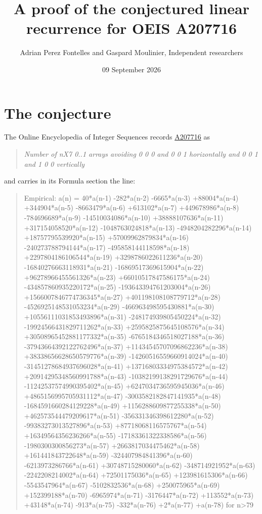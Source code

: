 \documentclass[11pt]{article}
\title{A proof of the conjectured linear recurrence for OEIS A207716}
\author{Adrian Perez Fontelles and Gaspard Moulinier, Independent researchers}
\date{09 September 2026}
\theoremstyle{definition}
\begin{document}
\maketitle
\section{The conjecture}

The Online Encyclopedia of Integer Sequences records \href{https://oeis.org/A207716}{A207716} as

\begin{quote}\itshape Number of nX7 0..1 arrays avoiding 0 0 0 and 0 0 1 horizontally and 0 0 1 and 1 0 0 vertically\end{quote}

and carries in its Formula section the line:

\begin{quote}\ttfamily Empirical: a(n) = 40*a(n-1) -282*a(n-2) -6665*a(n-3) +88004*a(n-4) +344904*a(n-5) -8663479*a(n-6) +613102*a(n-7) +449678986*a(n-8) -784696689*a(n-9) -14510034086*a(n-10) +38888107636*a(n-11) +317154058520*a(n-12) -1048763024818*a(n-13) -4948204282296*a(n-14) +18757795539920*a(n-15) +57009962879834*a(n-16) -240273788794144*a(n-17) -495858144118598*a(n-18) +2297804186106544*a(n-19) +3298786022611236*a(n-20) -16840276663118931*a(n-21) -16869517369615904*a(n-22) +96278966455561326*a(n-23) +66010517847586175*a(n-24) -434857860935220172*a(n-25) -193643394761203004*a(n-26) +1566007846774736345*a(n-27) +401198108108779712*a(n-28) -4526925148531053234*a(n-29) -466963498595430881*a(n-30) +10556111031853493896*a(n-31) -248174939805450224*a(n-32) -19924566431829711262*a(n-33) +2595825875645108576*a(n-34) +30508965452881177332*a(n-35) -6765184346518027188*a(n-36) -37943664392122762496*a(n-37) +11434545707096862236*a(n-38) +38338656628650579776*a(n-39) -14260516559660914024*a(n-40) -31451278684937696028*a(n-41) +13716803334975384572*a(n-42) +20914295348560991788*a(n-43) -10382199138291729676*a(n-44) -11242537574990395402*a(n-45) +6247034736595945036*a(n-46) +4865156995705931112*a(n-47) -3003582182847141935*a(n-48) -1684591660284129228*a(n-49) +1156288609877255338*a(n-50) +462573544479209617*a(n-51) -356331346398612280*a(n-52) -99383273013527896*a(n-53) +87718068116575767*a(n-54) +16349564356236266*a(n-55) -17183361322338586*a(n-56) -1980300300856273*a(n-57) +2663817034475462*a(n-58) +161441843722648*a(n-59) -324407984841396*a(n-60) -6213973286766*a(n-61) +30748715280060*a(n-62) -348714921952*a(n-63) -2242208214002*a(n-64) +72501175036*a(n-65) +123981615306*a(n-66) -5543547964*a(n-67) -5102832536*a(n-68) +250075965*a(n-69) +152399188*a(n-70) -6965974*a(n-71) -3176447*a(n-72) +113552*a(n-73) +43148*a(n-74) -913*a(n-75) -332*a(n-76) +2*a(n-77) +a(n-78) for n>79\end{quote}
\end{document}

